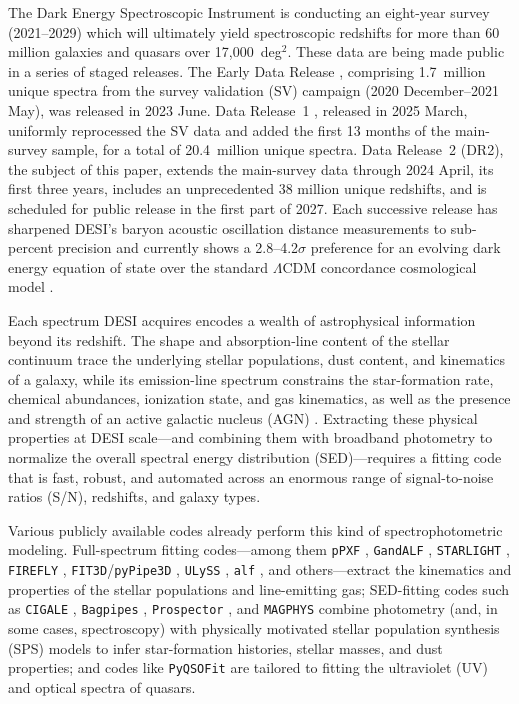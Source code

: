 \documentclass[modern,linenumbers]{aastex702}
\begin{document}
The Dark Energy Spectroscopic Instrument \citep[DESI;][]{levi13a,
  desi-collaboration16a, desi-collaboration24e} is conducting an
eight-year survey (2021--2029) which will ultimately yield
spectroscopic redshifts for more than 60 million galaxies and quasars
over 17,000~deg$^2$. These data are being made public in a series of
staged releases. The Early Data Release
\citep[EDR;][]{desi-collaboration24d}, comprising 1.7~million unique
spectra from the survey validation (SV) campaign (2020 December--2021
May), was released in 2023 June. Data Release~1
\citep[DR1;][]{desi-collaboration26a}, released in 2025 March,
uniformly reprocessed the SV data and added the first 13 months of the
main-survey sample, for a total of 20.4~million unique spectra. Data
Release~2 (DR2), the subject of this paper, extends the main-survey
data through 2024 April, its first three years, includes an
unprecedented 38 million unique redshifts, and is scheduled for public
release in the first part of 2027. Each successive release has
sharpened DESI's baryon acoustic oscillation distance measurements to
sub-percent precision and currently shows a 2.8--4.2$\sigma$
preference for an evolving dark energy equation of state over the
standard $\Lambda$CDM concordance cosmological model \citep{adame25b,
  adame25d, adame25e, abdul-karim25a, abdul-karim25b}.

Each spectrum DESI acquires encodes a wealth of astrophysical
information beyond its redshift. The shape and absorption-line content
of the stellar continuum trace the underlying stellar populations,
dust content, and kinematics of a galaxy, while its emission-line
spectrum constrains the star-formation rate, chemical abundances,
ionization state, and gas kinematics, as well as the presence and
strength of an active galactic nucleus (AGN) \citep[and references
  therein]{conroy13a}. Extracting these physical properties at DESI
scale---and combining them with broadband photometry to normalize the
overall spectral energy distribution (SED)---requires a fitting code
that is fast, robust, and automated across an enormous range of
signal-to-noise ratios (S/N), redshifts, and galaxy types.

Various publicly available codes already perform this kind of
spectrophotometric modeling. Full-spectrum fitting codes---among them
\texttt{pPXF} \citep{cappellari04a, cappellari23a}, \texttt{GandALF}
\citep{sarzi06a, sarzi17a}, \texttt{STARLIGHT}
\citep{cid-fernandes05a}, \texttt{FIREFLY} \citep{wilkinson17a},
\texttt{FIT3D}/\texttt{pyPipe3D} \citep{sanchez16a, sanchez22a},
\texttt{ULySS} \citep{koleva09a}, \texttt{alf} \citep{conroy18a}, and
others---extract the kinematics and properties of the stellar
populations and line-emitting gas; SED-fitting codes such as
\texttt{CIGALE} \citep{boquien19a}, \texttt{Bagpipes}
\citep{carnall18a}, \texttt{Prospector} \citep{johnson21a}, and
\texttt{MAGPHYS} \citep{da-cunha08a} combine photometry (and, in some
cases, spectroscopy) with physically motivated stellar population
synthesis (SPS) models to infer star-formation histories, stellar
masses, and dust properties; and codes like \texttt{PyQSOFit}
\citep{guo18a} are tailored to fitting the ultraviolet (UV) and
optical spectra of quasars.
\end{document}
